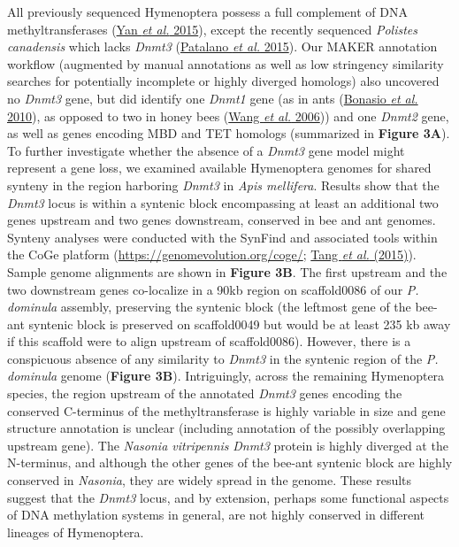 \documentclass[]{article}
\begin{document}
All previously sequenced Hymenoptera possess a full complement of DNA
methyltransferases (\protect\hyperlink{ux5fENREFux5f75}{Yan \emph{et
al.} 2015}), except the recently sequenced \emph{Polistes canadensis}
which lacks \emph{Dnmt3} (\protect\hyperlink{ux5fENREFux5f43}{Patalano
\emph{et al.} 2015}). Our MAKER annotation workflow (augmented by manual
annotations as well as low stringency similarity searches for
potentially incomplete or highly diverged homologs) also uncovered no
\emph{Dnmt3} gene, but did identify one \emph{Dnmt1} gene (as in ants
(\protect\hyperlink{ux5fENREFux5f5}{Bonasio \emph{et al.} 2010}), as
opposed to two in honey bees (\protect\hyperlink{ux5fENREFux5f66}{Wang
\emph{et al.} 2006})) and one \emph{Dnmt2} gene, as well as genes
encoding MBD and TET homologs (summarized in \textbf{Figure 3A}). To
further investigate whether the absence of a \emph{Dnmt3} gene model
might represent a gene loss, we examined available Hymenoptera genomes
for shared synteny in the region harboring \emph{Dnmt3} in \emph{Apis
mellifera}. Results show that the \emph{Dnmt3} locus is within a
syntenic block encompassing at least an additional two genes upstream
and two genes downstream, conserved in bee and ant genomes. Synteny
analyses were conducted with the SynFind and associated tools within the
CoGe platform (\url{https://genomevolution.org/coge/};
\protect\hyperlink{ux5fENREFux5f60}{Tang \emph{et al.} (2015)}). Sample
genome alignments are shown in \textbf{Figure 3B}. The first upstream
and the two downstream genes co-localize in a 90kb region on
scaffold0086 of our \emph{P. dominula} assembly, preserving the syntenic
block (the leftmost gene of the bee-ant syntenic block is preserved on
scaffold0049 but would be at least 235 kb away if this scaffold were to
align upstream of scaffold0086). However, there is a conspicuous absence
of any similarity to \emph{Dnmt3} in the syntenic region of the \emph{P.
dominula} genome (\textbf{Figure 3B}). Intriguingly, across the
remaining Hymenoptera species, the region upstream of the annotated
\emph{Dnmt3} genes encoding the conserved C-terminus of the
methyltransferase is highly variable in size and gene structure
annotation is unclear (including annotation of the possibly overlapping
upstream gene). The \emph{Nasonia vitripennis} \emph{Dnmt3} protein is
highly diverged at the N-terminus, and although the other genes of the
bee-ant syntenic block are highly conserved in \emph{Nasonia}, they are
widely spread in the genome. These results suggest that the \emph{Dnmt3}
locus, and by extension, perhaps some functional aspects of DNA
methylation systems in general, are not highly conserved in different
lineages of Hymenoptera.
\end{document}
